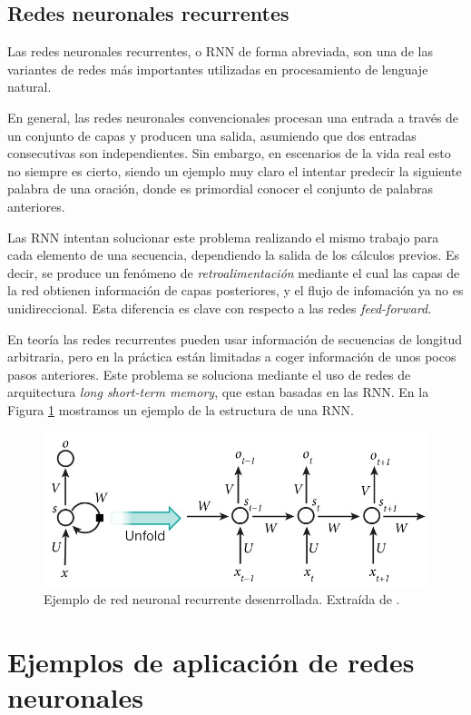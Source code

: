 \documentclass[
  a4paper,
  12pt,
  spanish,
]{scrartcl}
\theoremstyle{teorema-style}
\begin{document}
\begin{enumerate}
\subsection{Redes neuronales recurrentes}%
\label{sub:redes_neuronales_recurrentes}

Las redes neuronales recurrentes, o RNN de forma abreviada, son una de las variantes de redes más importantes utilizadas en procesamiento de lenguaje natural.

En general, las redes neuronales convencionales procesan una entrada a través de un conjunto de capas y producen una salida, asumiendo que dos entradas consecutivas son independientes. Sin embargo, en escenarios de la vida real esto no siempre es cierto, siendo un ejemplo muy claro el intentar predecir la siguiente palabra de una oración, donde es primordial conocer el conjunto de palabras anteriores.

Las RNN intentan solucionar este problema realizando el mismo trabajo para cada elemento de una secuencia, dependiendo la salida de los cálculos previos. Es decir, se produce un fenómeno de \textit{retroalimentación} mediante el cual las capas de la red obtienen información de capas posteriores, y el flujo de infomación ya no es unidireccional. Esta diferencia es clave con respecto a las redes \textit{feed-forward}.

En teoría las redes recurrentes pueden usar información de secuencias de longitud arbitraria, pero en la práctica están limitadas a coger información de unos pocos pasos anteriores. Este problema se soluciona mediante el uso de redes de arquitectura \textit{long short-term memory}, que estan basadas en las RNN. En la Figura \ref{fig:rnn} mostramos un ejemplo de la estructura de una RNN.

\begin{figure}[h]
    \centering
    \includegraphics[width=0.7\linewidth]{img/rnn.jpeg}
    \caption{Ejemplo de red neuronal recurrente desenrrollada. Extraída de \parencite{nigam_understanding_2018}.}%
    \label{fig:rnn}
\end{figure}

\section{Ejemplos de aplicación de redes neuronales}
\label{sec:ejemplos}


\end{enumerate}
\end{document}
